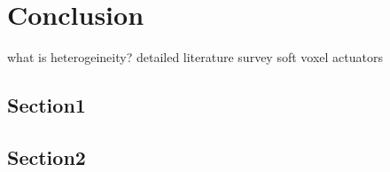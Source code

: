\chapter{Conclusion}
what is heterogeineity?
detailed literature survey
soft voxel actuators
\section{Section1}
\section{Section2}